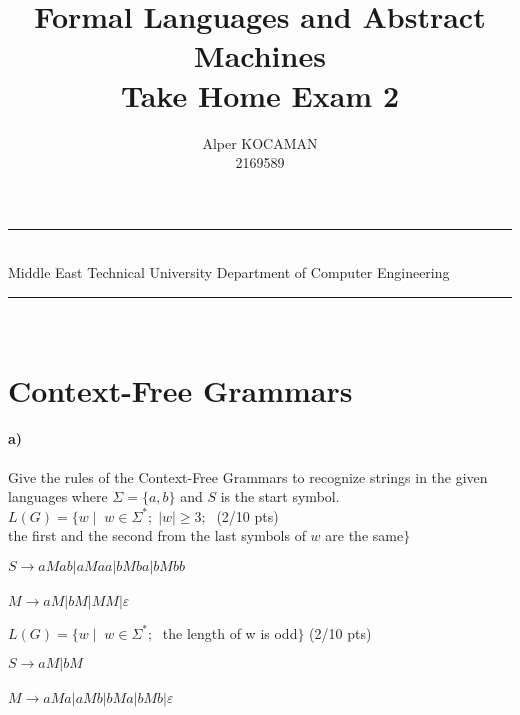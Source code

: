 \documentclass[a4paper,12pt]{article}
\title{Formal Languages and Abstract Machines \\ Take Home Exam 2}
\author{Alper KOCAMAN \\ 2169589} %
\date{} %
\newcommand{\HRule}{\rule{\linewidth}{1mm}}
\begin{document}
\HRule\\
Middle East Technical University \hfill Department of Computer Engineering
{\let\newpage\relax\maketitle}
\HRule\\
\vspace{1cm}


\section{Context-Free Grammars \hfill {}}

\paragraph{a)} Give the rules of the Context-Free Grammars to recognize strings in the given languages where $\Sigma=\{a,b\}$ and $S$ is the start symbol. \\  

$L(G)=\{w \mid \;  w \in \Sigma^*;\; |w| \geq 3;\; $  \hfill \small{(2/10 pts)} \\
\hspace*{22mm} the first and the second from the last symbols of $w$ are the same$\}$ \\

\begin{tcolorbox}

$S \to aMab|aMaa|bMba|bMbb$\\\\
$M \to aM|bM|MM|\varepsilon$\\

\end{tcolorbox}


$L(G)=\{w \mid \;  w \in \Sigma^*;\; $ the length of w is odd$\}$ \hfill \small{(2/10 pts)} \\

\begin{tcolorbox}

$S \to aM|bM$\\\\
$M \to aMa|aMb|bMa|bMb|\varepsilon$\\

\end{tcolorbox}
\end{document}

